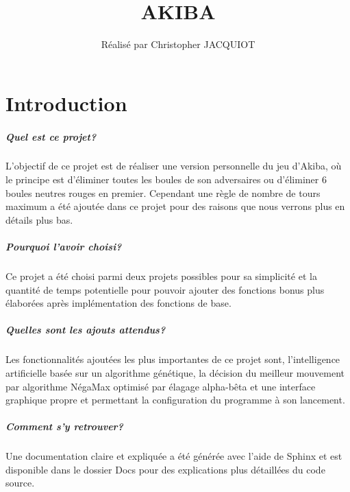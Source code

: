 \documentclass{scrreprt}
\title{\Huge \bfseries AKIBA}
\author{Réalisé par Christopher JACQUIOT}
\date{}
\begin{document}
\maketitle

\tableofcontents

\chapter{Introduction}
	\paragraph{Quel est ce projet?}
	
	L'objectif de ce projet est de réaliser une version personnelle du jeu d'Akiba, où le principe est d'éliminer toutes les boules de son adversaires ou d'éliminer 6 boules neutres rouges en premier. Cependant une règle de nombre de tours maximum a été ajoutée dans ce projet pour des raisons que nous verrons plus en détails plus bas.
	
	\paragraph{Pourquoi l'avoir choisi?} 
	
	Ce projet a été choisi parmi deux projets possibles pour sa simplicité et la quantité de temps potentielle pour pouvoir ajouter des fonctions bonus plus élaborées après implémentation des fonctions de base.
	
	\paragraph{Quelles sont les ajouts attendus?}
	
	Les fonctionnalités ajoutées les plus importantes de ce projet sont, l'intelligence artificielle basée sur un algorithme génétique, la décision du meilleur mouvement par algorithme NégaMax optimisé par élagage alpha-bêta et une interface graphique propre et permettant la configuration du programme à son lancement.
	
	\paragraph{Comment s'y retrouver?} 
	
	Une documentation claire et expliquée a été générée avec l'aide de Sphinx et est disponible dans le dossier Docs pour des explications plus détaillées du code source.
	
\end{document}
